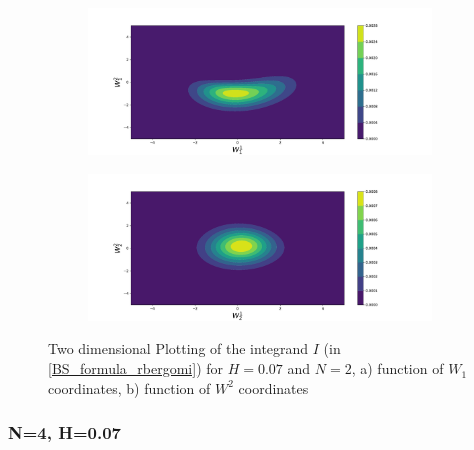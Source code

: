 \documentclass[11pt]{article}
\begin{document}
\begin{figure}[h!]
	\centering
	\begin{subfigure}{.4\textwidth}
		\centering
		\includegraphics[width=1\linewidth]{./figures/integrand_plotting_rBergomi/2D_plots/N_2/H_007/Bergomi_integrand_contours_K_1_H_007_W1_1_2_N_2}
		\caption{}
		\label{fig:sub3}
	\end{subfigure}%
	\begin{subfigure}{.4\textwidth}
		\centering
		\includegraphics[width=1\linewidth]{./figures/integrand_plotting_rBergomi/2D_plots/N_2/H_007/Bergomi_integrand_contours_K_1_H_007_W2_1_2_N_2}
		\caption{}
		\label{fig:sub4}
	\end{subfigure}
	\caption{Two dimensional Plotting of the integrand $I$ (in \eqref{BS_formula_rbergomi})  for $H=0.07$ and $N=2$, a)  function of $W_1$ coordinates, b) function of $W^2$ coordinates}
	\label{fig:Integrand_H_007_N_2_2D}
\end{figure}






\newpage
\subsubsection*{N=4, H=0.07}
\end{document}
